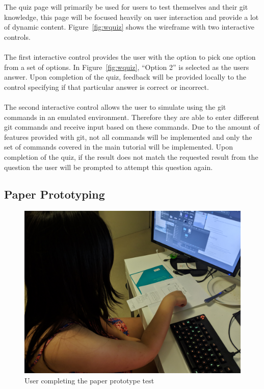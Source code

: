The quiz page will primarily be used for users to test themselves and their \gls{git} knowledge, this page will be focused heavily on user interaction and provide a lot of dynamic content. Figure~\ref{fig:wquiz} shows the wireframe with two interactive controls.\\\\
The first interactive control provides the user with the option to pick one option from a set of options. In Figure~\ref{fig:wquiz}, ``Option 2'' is selected as the users answer. Upon completion of the quiz, feedback will be provided locally to the control specifying if that particular answer is correct or incorrect.\\\\
The second interactive control allows the user to simulate using the \gls{git} commands in an emulated environment. Therefore they are able to enter different git commands and receive input based on these commands. Due to the amount of features provided with \gls{git}, not all commands will be implemented and only the set of commands covered in the main tutorial will be implemented. Upon completion of the quiz, if the result does not match the requested result from the question the user will be prompted to attempt this question again.


\subsection{Paper Prototyping}
\begin{figure}
	\centering
	\includegraphics[width=0.8\linewidth]{rainy}
	\caption{User completing the paper prototype test}
\end{figure}

